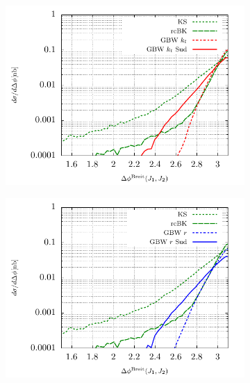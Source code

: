 \documentclass[11pt]{article}
\numberwithin{equation}{section}
\numberwithin{table}{section}
\numberwithin{figure}{section}
\begin{document}
\begin{figure}[p]
	\begin{subfigure}{0.5\textwidth}
		\includegraphics[width=\textwidth]{plots/plotGBW2Jets}
	\end{subfigure}
	\begin{subfigure}{0.5\textwidth}
		\includegraphics[width=\textwidth]{plots/plotGBW3Jets}
	\end{subfigure}


\end{figure}
\end{document}
